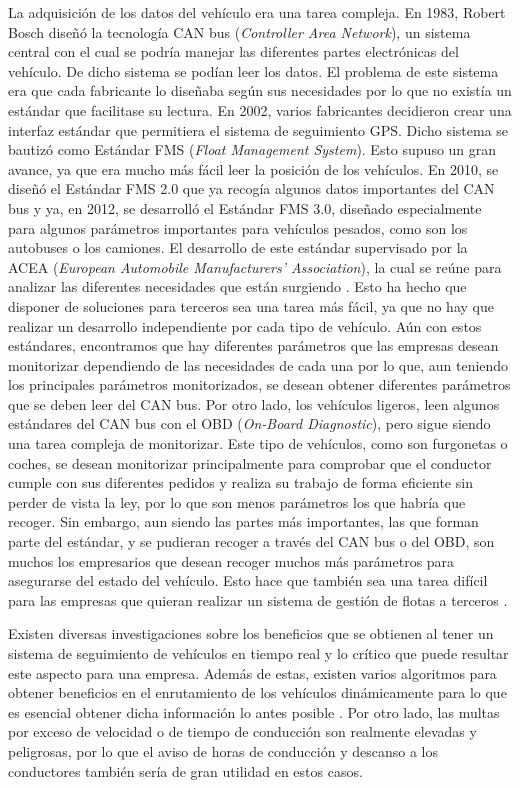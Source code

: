 La adquisición de los datos del vehículo era una tarea compleja. En
1983, Robert Bosch diseñó la tecnología CAN bus (\emph{Controller Area
  Network}), un sistema central con el cual se podría manejar las
diferentes partes electrónicas del vehículo. De dicho sistema se
podían leer los datos. El problema de este sistema era que cada
fabricante lo diseñaba según sus necesidades por lo que no existía un
estándar que facilitase su lectura. En 2002, varios fabricantes
decidieron crear una interfaz estándar que permitiera el sistema de
seguimiento GPS. Dicho sistema se bautizó como Estándar FMS
(\emph{Float Management System}). Esto supuso un gran avance, ya que
era mucho más fácil leer la posición de los vehículos. En 2010, se
diseñó el Estándar FMS 2.0 que ya recogía algunos datos importantes
del CAN bus y ya, en 2012, se desarrolló el Estándar FMS 3.0, diseñado
especialmente para algunos parámetros importantes para vehículos
pesados, como son los autobuses o los camiones. El desarrollo de este
estándar supervisado por la ACEA (\emph{European Automobile
  Manufacturers’ Association}), la cual se reúne para analizar las
diferentes necesidades que están surgiendo \cite{2-1}. Esto ha hecho
que disponer de soluciones para terceros sea una tarea más fácil, ya
que no hay que realizar un desarrollo independiente por cada tipo de
vehículo. Aún con estos estándares, encontramos que hay diferentes
parámetros que las empresas desean monitorizar dependiendo de las
necesidades de cada una por lo que, aun teniendo los principales
parámetros monitorizados, se desean obtener diferentes parámetros que
se deben leer del CAN bus. Por otro lado, los vehículos ligeros, leen
algunos estándares del CAN bus con el OBD (\emph{On-Board
  Diagnostic}), pero sigue siendo una tarea compleja de monitorizar.
Este tipo de vehículos, como son furgonetas o coches, se desean
monitorizar principalmente para comprobar que el conductor cumple con
sus diferentes pedidos y realiza su trabajo de forma eficiente sin
perder de vista la ley, por lo que son menos parámetros los que habría
que recoger. Sin embargo, aun siendo las partes más importantes, las
que forman parte del estándar, y se pudieran recoger a través del CAN
bus o del OBD, son muchos los empresarios que desean recoger muchos
más parámetros para asegurarse del estado del vehículo. Esto hace que
también sea una tarea difícil para las empresas que quieran realizar
un sistema de gestión de flotas a terceros \cite{2-2}.

Existen diversas investigaciones sobre los beneficios que se obtienen
al tener un sistema de seguimiento de vehículos en tiempo real y lo
crítico que puede resultar este aspecto para una empresa. Además de
estas, existen varios algoritmos para obtener beneficios en el
enrutamiento de los vehículos dinámicamente para lo que es esencial
obtener dicha información lo antes posible \cite{1-1-4}. Por otro
lado, las multas por exceso de velocidad \cite{1-1-5} o de tiempo de
conducción \cite{1-1-6} son realmente elevadas y peligrosas, por lo
que el aviso de horas de conducción y descanso a los conductores
también sería de gran utilidad en estos casos.

